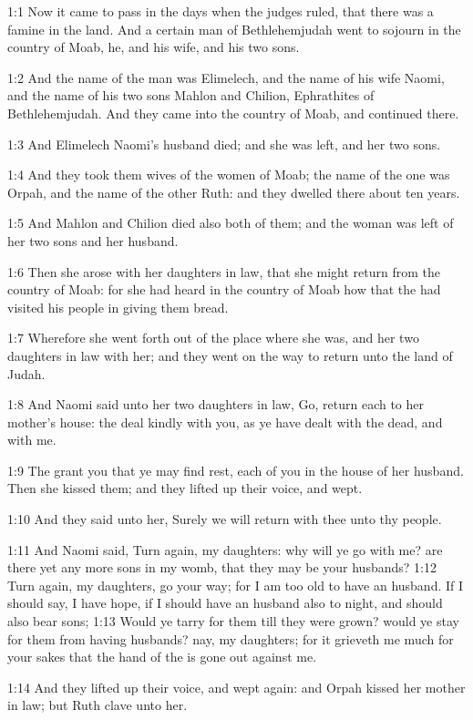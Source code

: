 
1:1 Now it came to pass in the days when the judges ruled, that there was a famine in the land. And a certain man of Bethlehemjudah went to sojourn in the country of Moab, he, and his wife, and his two sons.

1:2 And the name of the man was Elimelech, and the name of his wife Naomi, and the name of his two sons Mahlon and Chilion, Ephrathites of Bethlehemjudah. And they came into the country of Moab, and continued there.

1:3 And Elimelech Naomi's husband died; and she was left, and her two sons.

1:4 And they took them wives of the women of Moab; the name of the one was Orpah, and the name of the other Ruth: and they dwelled there about ten years.

1:5 And Mahlon and Chilion died also both of them; and the woman was left of her two sons and her husband.

1:6 Then she arose with her daughters in law, that she might return from the country of Moab: for she had heard in the country of Moab how that the \LORD had visited his people in giving them bread.

1:7 Wherefore she went forth out of the place where she was, and her two daughters in law with her; and they went on the way to return unto the land of Judah.

1:8 And Naomi said unto her two daughters in law, Go, return each to her mother's house: the \LORD deal kindly with you, as ye have dealt with the dead, and with me.

1:9 The \LORD grant you that ye may find rest, each of you in the house of her husband. Then she kissed them; and they lifted up their voice, and wept.

1:10 And they said unto her, Surely we will return with thee unto thy people.

1:11 And Naomi said, Turn again, my daughters: why will ye go with me?  are there yet any more sons in my womb, that they may be your husbands?  1:12 Turn again, my daughters, go your way; for I am too old to have an husband. If I should say, I have hope, if I should have an husband also to night, and should also bear sons; 1:13 Would ye tarry for them till they were grown? would ye stay for them from having husbands? nay, my daughters; for it grieveth me much for your sakes that the hand of the \LORD is gone out against me.

1:14 And they lifted up their voice, and wept again: and Orpah kissed her mother in law; but Ruth clave unto her.

